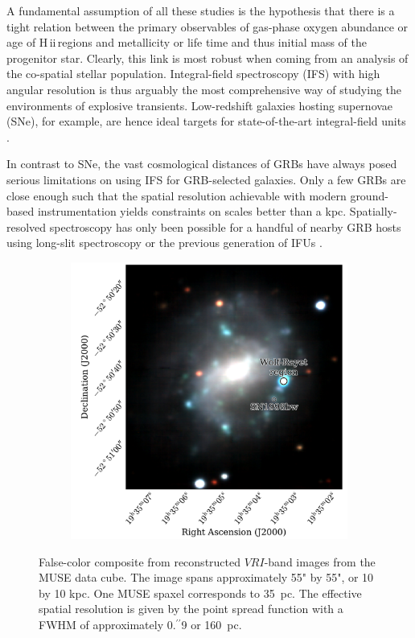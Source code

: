 \documentclass[traditabstract]{aa}
\newcommand{\farc}{\hbox{$.\!\!^{\prime\prime}$}}
\newcommand{\hii}{\mbox{H\,{\sc ii}}}
\begin{document}
A fundamental assumption of all these studies is the hypothesis that there is a tight relation between the primary observables of gas-phase oxygen abundance or age of \hii\,regions and metallicity or life time and thus initial mass of the progenitor star. Clearly, this link is most robust when coming from an analysis of the co-spatial stellar population. Integral-field spectroscopy (IFS) with high angular resolution is thus arguably the most comprehensive way of studying the environments of explosive transients. Low-redshift galaxies hosting supernovae (SNe), for example, are hence ideal targets for state-of-the-art integral-field units \citep[IFUs, e.g.][]{2013AJ....146...30K, 2013AJ....146...31K, 2014A&A...572A..38G}.

In contrast to SNe, the vast cosmological distances of GRBs \citep[e.g.][]{2009ApJS..185..526F, 2009Natur.461.1254T, 2012ApJ...758...46K} have always posed serious limitations on using IFS for GRB-selected galaxies. Only a few GRBs are close enough such that the spatial resolution achievable with modern ground-based instrumentation yields constraints on scales better than a kpc. Spatially-resolved spectroscopy has only been possible for a handful of nearby GRB hosts using long-slit spectroscopy \citep[e.g.][]{2008ApJ...676.1151T, 2011ApJ...739...23L, 2015A&A...579A.126S} or the previous generation of IFUs \citep{2008A&A...490...45C, 2014MNRAS.441.2034T}. 

\begin{figure}
\begin{subfigure}{.48\textwidth}
  \includegraphics[width=0.999\linewidth]{Figs/MUSE_SN1998bw_RGB.pdf}
\end{subfigure}
\caption{False-color composite from reconstructed $VRI$-band images from the MUSE data cube. The image spans approximately 55" by 55", or 10 by 10 kpc. One MUSE spaxel corresponds to 35~pc. The effective spatial resolution is given by the point spread function with a FWHM of approximately 0\farc{9} or 160~pc.}
\label{fig:Host}
\end{figure}
\end{document}
